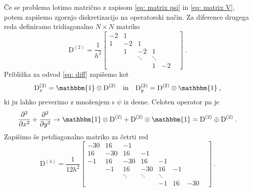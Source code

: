 \documentclass[11pt]{report}
\newcommand{\pt}{\partial^2}
\newcommand{\ptx}{\partial x^2}
\newcommand{\pty}{\partial y^2}
\newcommand{\D}{\text{D}}
\begin{document}
Če se problema lotimo matrično z zapisom \ref{eq: matrix psi} in \ref{eq: matrix V}, potem zapišemo zgornjo diskretizacijo
na operatorski način. Za diference drugega reda definiramo tridiagonalno $N \times N$ matriko
\begin{equation}
	\D^{(2)} = \frac{1}{h^2}
	\begin{bmatrix}
		-2 & 1  &        &        &    & \\
		1  & -2 & 1      &        &    & \\
		   & 1  & -2     & 1      &    & \\
		   &    & \ddots & \ddots &      \\
		   &    &        & 1      & -2
	\end{bmatrix} \>.
\end{equation}
Približka za odvod \ref{eq: diff} zapišemo kot
\begin{equation}
	\D^{(2)}_x = \mathbbm{1} \otimes \D^{(2)} \quad \text{in} \quad \D_y^{(2)} = \D^{(2)} \otimes \mathbbm{1} \>,
\end{equation}
ki ju lahko preverimo z množenjem s $\psi$ iz desne.
Celoten operator pa je
\begin{equation}
	\label{eq: DD}
	\frac{\pt}{\ptx} + \frac{\pt}{\pty} \rightarrow \mathbbm{1} \otimes \D^{(2)} + \D^{(2)} \otimes \mathbbm{1} =
	\D^{(2)} \oplus \D^{(2)} \>.
\end{equation}
Zapišimo še petdiagonalno matriko za četrti red
\begin{equation}
	\D^{(4)} = \frac{1}{12 h^2}
	\begin{bmatrix}
		-30 & 16  & -1                                    \\
		16  & -30 & 16     & -1                           \\
		-1  & 16  & -30    & 16     & -1                  \\
		    & -1  & 16     & -30    & 16     & -1         \\
		    &     & \ddots & \ddots & \ddots &    &       \\
		    &     &        &        & -1     & 16 & -30 &
	\end{bmatrix} \>.
\end{equation}
\end{document}
